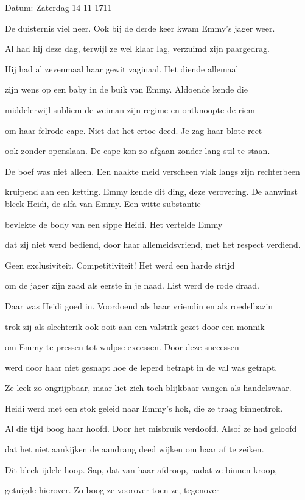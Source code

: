 Datum: Zaterdag 14-11-1711

De duisternis viel neer.
Ook bij de derde keer
kwam Emmy’s jager weer.

Al had hij deze dag,
terwijl ze wel klaar lag,
verzuimd zijn paargedrag.

Hij had al zevenmaal
haar gewit vaginaal.
Het diende allemaal

zijn wens op een baby
in de buik van Emmy.
Aldoende kende die

middelerwijl subliem
de weiman zijn regime
en ontknoopte de riem

om haar felrode cape.
Niet dat het ertoe deed.
Je zag haar blote reet

ook zonder openslaan.
De cape kon zo afgaan
zonder lang stil te staan.

De boef was niet alleen.
Een naakte meid verscheen
vlak langs zijn rechterbeen

kruipend aan een ketting.
Emmy kende dit ding,
deze verovering.
De aanwinst bleek Heidi,
de alfa van Emmy.
Een witte substantie

bevlekte de body
van een sippe Heidi.
Het vertelde Emmy

dat zij niet werd bediend,
door haar allemeidsvriend,
met het respect verdiend.

Geen exclusiviteit. Competitiviteit!
Het werd een harde strijd

om de jager zijn zaad
als eerste in je naad.
List werd de rode draad.

Daar was Heidi goed in.
Voordoend als haar vriendin
en als roedelbazin

trok zij als slechterik
ook ooit aan een valstrik
gezet door een monnik

om Emmy te pressen
tot wulpse excessen.
Door deze successen

werd door haar niet gesnapt
hoe de leperd betrapt
in de val was getrapt.

Ze leek zo ongrijpbaar,
maar liet zich toch blijkbaar
vangen als handelswaar.

Heidi werd met een stok
geleid naar Emmy’s hok,
die ze traag binnentrok.

Al die tijd boog haar hoofd.
Door het misbruik verdoofd.
Alsof ze had geloofd

dat het niet aankijken
de aandrang deed wijken
om haar af te zeiken.

Dit bleek ijdele hoop.
Sap, dat van haar afdroop,
nadat ze binnen kroop,

getuigde hierover.
Zo boog ze voorover
toen ze, tegenover

